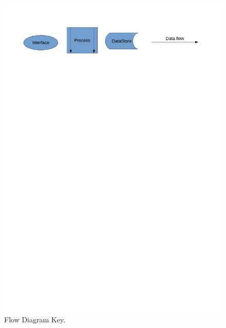 \begin{center}
    \begin{figure}[H]
        \includegraphics[width=\textwidth]{./Analysis/Dataflow/DFD_analysis_key.pdf}
        \caption{Flow Diagram Key.} \label{fig:print_function_result}
    \end{figure}


\end{center}

